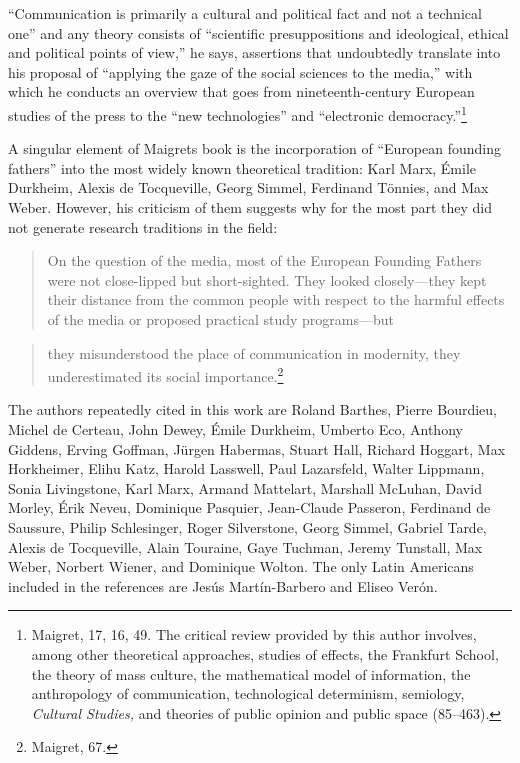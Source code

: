 \documentclass{tufte-handout}
\begin{document}
``Communication is primarily a cultural and political fact and not a
technical one'' and any theory consists of ``scientific presuppositions
and ideological, ethical and political points of view,'' he says,
assertions that undoubtedly translate into his proposal of ``applying
the gaze of the social sciences to the media,'' with which he conducts
an overview that goes from nineteenth-century European studies of the
press to the ``new technologies'' and ``electronic
democracy.''\footnote{Maigret, 17, 16, 49. The critical review provided
  by this author involves, among other theoretical approaches, studies
  of effects, the Frankfurt School, the theory of mass culture, the
  mathematical model of information, the anthropology of communication,
  technological determinism, semiology, \emph{Cultural Studies,} and
  theories of public opinion and public space (85--463).}


A singular element of Maigret\textquotesingle s book is the
incorporation of ``European founding fathers'' into the most widely
known theoretical tradition: Karl Marx, Émile Durkheim, Alexis de
Tocqueville, Georg Simmel, Ferdinand Tönnies, and Max Weber. However,
his criticism of them suggests why for the most part they did not
generate research traditions in the field:

\begin{quote}
On the question of the media, most of the European Founding Fathers were
not close-lipped but short-sighted. They looked closely---they kept
their distance from the common people with respect to the harmful
effects of the media or proposed practical study programs---but\end{quote}\newpage \begin{quote}they
misunderstood the place of communication in modernity, they
underestimated its social importance.\footnote{Maigret, 67.}
\end{quote}

\noindent The authors repeatedly cited in this work are Roland Barthes, Pierre
Bourdieu, Michel de Certeau, John Dewey, Émile Durkheim, Umberto Eco,
Anthony Giddens, Erving Goffman, Jürgen Habermas, Stuart Hall, Richard
Hoggart, Max Horkheimer, Elihu Katz, Harold Lasswell, Paul Lazarsfeld,
Walter Lippmann, Sonia Livingstone, Karl Marx, Armand Mattelart,
Marshall McLuhan, David Morley, Érik Neveu, Dominique Pasquier,
Jean-Claude Passeron, Ferdinand de Saussure, Philip Schlesinger, Roger
Silverstone, Georg Simmel, Gabriel Tarde, Alexis de Tocqueville, Alain
Touraine, Gaye Tuchman, Jeremy Tunstall, Max Weber, Norbert Wiener, and
Dominique Wolton. The only Latin Americans included in the references
are Jesús Martín-Barbero and Eliseo Verón.
\end{document}
